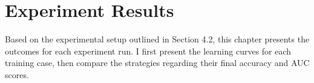 \documentclass[english,bachelor,ul]{webisthesis} %
\begin{document}
\section{Experiment Results}

Based on the experimental setup outlined in Section 4.2, this chapter presents the outcomes for each experiment run. I first present the learning curves for each training case, then compare the strategies regarding their final accuracy and AUC scores.

\end{document}
